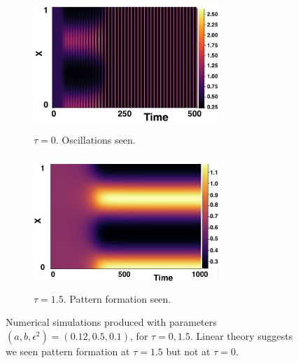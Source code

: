 \documentclass[12pt]{report}
\begin{document}
\begin{figure}[h]
    \centering
    \begin{subfigure}[b]{0.45\textwidth}
        \centering
        \includegraphics[width=7cm,height=5cm]{toscill.png}
        \caption{$\tau=0$. Oscillations seen.}
        \label{}
    \end{subfigure}
    \hfill
    \begin{subfigure}[b]{0.45\textwidth}
        \centering
        \includegraphics[width=7cm,height=5cm]{tpattpred.png}
        \caption{$\tau=1.5$. Pattern formation seen.}
        \label{}
    \end{subfigure}
    \caption{Numerical simulations produced with parameters $(a,b,\epsilon^2)=(0.12,0.5,0.1)$, for $\tau=0,1.5$. Linear theory suggests we seen pattern formation at $\tau=1.5$ but not at $\tau=0$.}
    \label{fig:testturing}
\end{figure}
\end{document}
